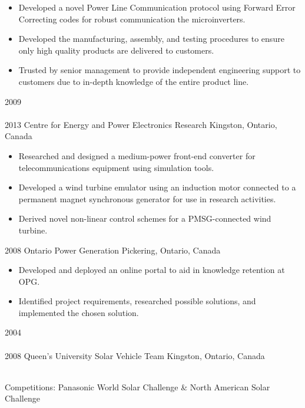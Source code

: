 \begin{entrylist}
{\begin{itemize}[leftmargin=12pt]
	\item Developed a novel Power Line Communication protocol using Forward Error Correcting codes for robust communication the microinverters.
	\item Developed the manufacturing, assembly, and testing procedures to ensure only high quality products are delivered to customers.
	\item Trusted by senior management to provide independent engineering support to customers due to in-depth knowledge of the entire product line.
\end{itemize}
}
\entry
  {2009\\\faChevronDown\\2013}
  {Centre for Energy and Power Electronics Research}
  {Kingston, Ontario, Canada}
  {
  \begin{itemize}[leftmargin=12pt]
    \item Researched and designed a medium-power front-end converter for telecommunications equipment using simulation tools.
    \item Developed a wind turbine emulator using an induction motor connected to a permanent magnet synchronous generator for use in research activities.
    \item Derived novel non-linear control schemes for a PMSG-connected wind turbine.
  \end{itemize}}
\entry
  {2008}
  {Ontario Power Generation}
  {Pickering, Ontario, Canada}
  {
  \begin{itemize}[leftmargin=12pt]
    \item Developed and deployed an online portal to aid in knowledge retention at OPG.
    \item Identified project requirements, researched possible solutions, and implemented the chosen solution.
  \end{itemize}
}
\entry
  {2004\\\faChevronDown\\2008}
  {Queen's University Solar Vehicle Team}
  {Kingston, Ontario, Canada}
  {\\
  Competitions: {\bodyfontit Panasonic World Solar Challenge} \&
  {\bodyfontit North American Solar Challenge}
  \begin{itemize}[leftmargin=12pt]

\end{itemize}}
\end{entrylist}

